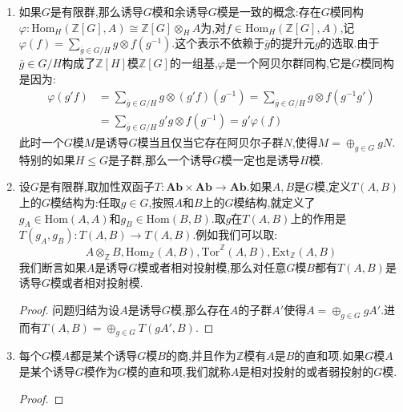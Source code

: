 \begin{enumerate}
\begin{itemize}
		特别的,取$H=\{e\}$得到:
		$$\mathrm{Hom}_G(\mathrm{Ind}^G(A),B)\cong\mathrm{Hom}_{\mathbb{Z}}(A,B)$$
	\end{itemize}
	\begin{proof}
		\begin{align*}
			\mathrm{Hom}_G(A,\mathrm{coInd}^G_H(B))&\cong\mathrm{Hom}_G(A,\mathrm{Hom}_H(\mathbb{Z}[G],B))\\&\cong\mathrm{Hom}_H(A\otimes_G\mathbb{Z}[G],B)\\&\cong\mathrm{Hom}_H(A,B)
		\end{align*}
		\begin{align*}
			\mathrm{Hom}_G(\mathrm{Ind}^G_H(A),B)&\cong\mathrm{Hom}_G(A\otimes_H\mathbb{Z}[G],B)\\&\cong\mathrm{Hom}_H(A,\mathrm{Hom}_G(\mathbb{Z}[G],B))\\&\cong\mathrm{Hom}_H(A,B)
		\end{align*}
	\end{proof}
	\item 如果$G$是有限群,那么诱导$G$模和余诱导$G$模是一致的概念:存在$G$模同构$\varphi:\mathrm{Hom}_H(\mathbb{Z}[G],A)\cong\mathbb{Z}[G]\otimes_HA$为,对$f\in\mathrm{Hom}_H(\mathbb{Z}[G],A)$,记$\varphi(f)=\sum_{\overline{g}\in G/H}g\otimes f(g^{-1})$.这个表示不依赖于$\overline{g}$的提升元$g$的选取.由于$\overline{g}\in G/H$构成了$\mathbb{Z}[H]$模$\mathbb{Z}[G]$的一组基,$\varphi$是一个阿贝尔群同构,它是$G$模同构是因为:
	\begin{align*}
		\varphi(g'f)&=\sum_{\overline{g}\in G/H}g\otimes(g'f)(g^{-1})=\sum_{\overline{g}\in G/H}g\otimes f(g^{-1}g')\\&=\sum_{\overline{g}\in G/H}g'g\otimes f(g^{-1})=g'\varphi(f)
	\end{align*}
	此时一个$G$模$M$是诱导$G$模当且仅当它存在阿贝尔子群$N$,使得$M=\oplus_{g\in G}gN$.特别的如果$H\le G$是子群,那么一个诱导$G$模一定也是诱导$H$模.
	\item 设$G$是有限群,取加性双函子$T:\textbf{Ab}\times\textbf{Ab}\to\textbf{Ab}$.如果$A,B$是$G$模,定义$T(A,B)$上的$G$模结构为:任取$g\in G$,按照$A$和$B$上的$G$模结构,就定义了$g_A\in\mathrm{Hom}(A,A)$和$g_B\in\mathrm{Hom}(B,B)$.取$g$在$T(A,B)$上的作用是$T(g_A,g_B):T(A,B)\to T(A,B)$.例如我们可以取:
	$$A\otimes_{\mathbb{Z}}B,\mathrm{Hom}_{\mathbb{Z}}(A,B),\mathrm{Tor}^{\mathbb{Z}}(A,B),\mathrm{Ext}_{\mathbb{Z}}(A,B)$$
	我们断言如果$A$是诱导$G$模或者相对投射模,那么对任意$G$模$B$都有$T(A,B)$是诱导$G$模或者相对投射模.
	\begin{proof}
		
		问题归结为设$A$是诱导$G$模,那么存在$A$的子群$A'$使得$A=\oplus_{g\in G}gA'$.进而有$T(A,B)=\oplus_{g\in G}T(gA',B)$.
	\end{proof}
	\item 每个$G$模$A$都是某个诱导$G$模$B$的商,并且作为$\mathbb{Z}$模有$A$是$B$的直和项.如果$G$模$A$是某个诱导$G$模作为$G$模的直和项,我们就称$A$是相对投射的或者弱投射的$G$模.
	\begin{proof}
		

\end{proof}
\end{enumerate}
